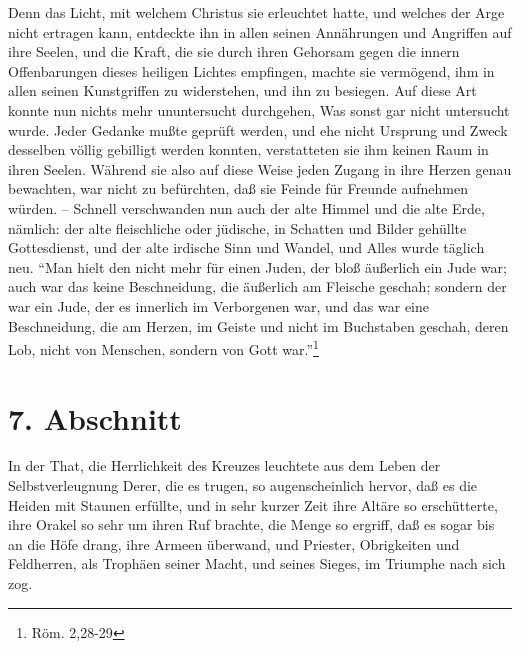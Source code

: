Denn das Licht, mit welchem Christus sie erleuchtet hatte, und welches der Arge nicht ertragen kann, entdeckte ihn in allen seinen Annährungen und Angriffen auf ihre Seelen, und die Kraft, die sie durch ihren Gehorsam gegen die innern Offenbarungen dieses heiligen Lichtes empfingen, machte sie vermögend, ihm in allen seinen Kunstgriffen zu widerstehen, und ihn zu besiegen. Auf diese Art konnte nun nichts mehr ununtersucht durchgehen, Was sonst gar nicht untersucht wurde. Jeder Gedanke mußte geprüft werden, und ehe nicht Ursprung und Zweck desselben völlig gebilligt werden konnten, verstatteten sie ihm keinen Raum in ihren Seelen. Während sie also auf diese Weise jeden Zugang in ihre Herzen genau bewachten, war nicht zu befürchten, daß sie Feinde für Freunde aufnehmen würden. -- Schnell verschwanden nun auch der alte Himmel und die alte Erde, nämlich: der alte fleischliche oder jüdische, in Schatten und Bilder gehüllte Gottesdienst, und der alte irdische Sinn und Wandel, und Alles wurde täglich neu. "`Man hielt den nicht mehr für einen Juden, der bloß äußerlich ein Jude war; auch war das keine Beschneidung, die äußerlich am Fleische geschah; sondern der war ein Jude, der es innerlich im Verborgenen war, und das war eine Beschneidung, die am Herzen, im Geiste und nicht im Buchstaben geschah, deren Lob, nicht von Menschen, sondern von Gott war."'\footnote{Röm. 2,28-29}

\section{7. Abschnitt}

In der That, die Herrlichkeit des Kreuzes leuchtete aus dem Leben der Selbstverleugnung Derer, die es trugen, so augenscheinlich hervor, daß es die Heiden mit Staunen erfüllte, und in sehr kurzer Zeit ihre Altäre so erschütterte, ihre Orakel so sehr um ihren Ruf brachte, die Menge so ergriff, daß es sogar bis an die Höfe drang, ihre Armeen überwand, und Priester, Obrigkeiten und Feldherren, als Trophäen seiner Macht, und seines Sieges, im Triumphe nach sich zog.

